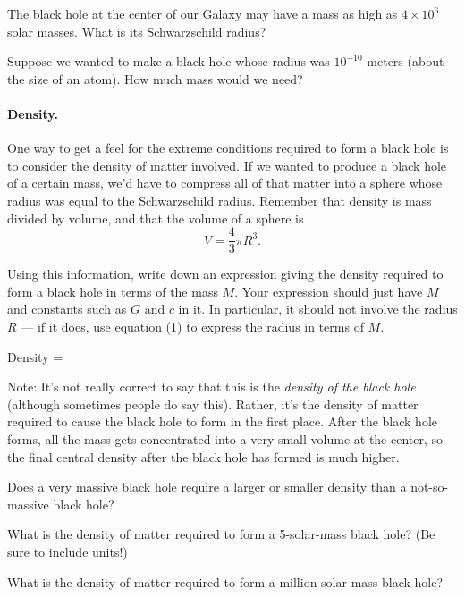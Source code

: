 \answerspace{1in}

\pagebreak[2]

The black hole at the center of our Galaxy may have a mass as high as 
$4\times 10^6$ solar masses.  What is its Schwarzschild radius?

\answerspace{1in}

Suppose we wanted to make a black hole whose radius was $10^{-10}$ meters
(about the size of an atom).  How much mass would we need?

\answerspace{1in}

\paragraph{Density.}
One way to get a feel for the extreme conditions required to form
a black hole is to consider the density of matter involved.
If we wanted to produce a black hole of a certain mass, we'd have
to compress all of that matter into a sphere whose radius was
equal to the Schwarzschild radius.  Remember that density is
mass divided by volume, and that the volume of a sphere is
$$
V=\frac{4}{3}\pi R^3.
$$

Using this information, 
write down an expression giving the density required to form a black
hole in terms of the mass $M$.  Your expression should just have $M$
and constants such as $G$ and $c$ in it.  In
particular, it should not involve the radius $R$ --- 
if it does, use equation (1) to 
express the radius in terms of $M$.

\answerspace{2in}

Density = 

\answerspace{0.5in}

Note: It's not really correct to say that this is the {\it density
of the black hole} (although sometimes people do say this).  Rather,
it's the density of matter required to cause the black hole to form in
the first place.  After the black hole forms, all the mass gets concentrated
into a very small volume at the center, so the final central density after the
black hole has formed is much higher.

Does a very massive black hole require a larger or smaller density
than a not-so-massive black hole?

\answerspace{1in}

What is the density of matter required to form a 5-solar-mass black hole?
(Be sure to include units!)

\answerspace{1in}

What is the density of matter required to form a million-solar-mass
black hole?

